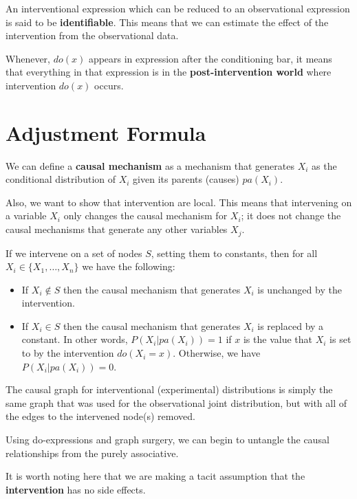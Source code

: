 An interventional expression which can be reduced to an observational expression
is said to be \textbf{identifiable}. This means that we can estimate the effect
of the intervention from the observational data.

Whenever, $do(x)$ appears in expression after the conditioning bar, it means
that everything in that expression is in the \textbf{post-intervention world}
where intervention $do(x)$ occurs.
\section{Adjustment Formula}
We can define a \textbf{causal mechanism} as a mechanism that generates $X_i$ as
the conditional distribution of $X_i$ given its parents (causes) $pa(X_i)$.

Also, we want to show that intervention are local. This means that intervening on
a variable $X_i$ only changes the causal mechanism for $X_i$; it does not change
the causal mechanisms that generate any other variables $X_j$.
\begin{definition}
      If we intervene on a set of nodes $S$, setting them to constants, then for
      all $X_i \in \{X_1, \ldots, X_n\}$ we have the following:
      \begin{itemize}
            \item If $X_i \notin S$ then the causal mechanism that generates $X_i$
                  is unchanged by the intervention.
            \item If $X_i \in S$ then the causal mechanism that generates $X_i$ is
                  replaced by a constant. In other words, $P(X_i | pa(X_i)) = 1$
                  if $x$ is the value that $X_i$ is set to by the intervention
                  $do(X_i = x)$. Otherwise, we have $P(X_i | pa(X_i)) = 0$.
      \end{itemize}
\end{definition}
\begin{note}
      The causal graph for interventional (experimental) distributions is simply
      the same graph that was used for the observational joint distribution, but
      with all of the edges to the intervened node(s) removed.
\end{note}
Using do-expressions and graph surgery, we can begin to untangle the causal
relationships from the purely associative.
\begin{note}
      It is worth noting here that we are making a tacit assumption that
      the \textbf{intervention} has no side effects.
\end{note}

